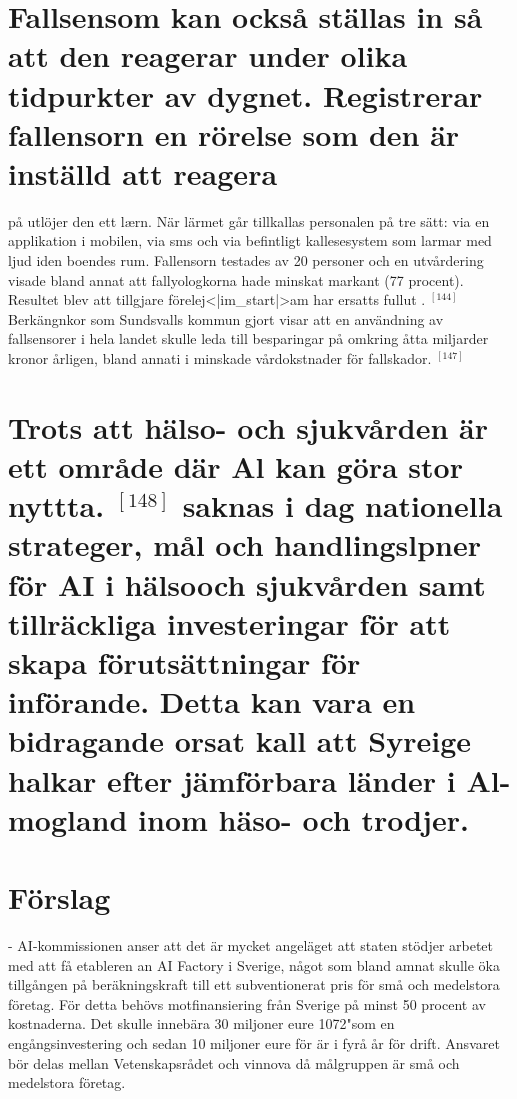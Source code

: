 {{{{{{{{{{{{{{{{{\section*{Fallsensom kan också ställas in så att den reagerar under olika tidpurkter av dygnet. Registrerar fallensorn en rörelse som den är inställd att reagera}
på utlöjer den ett lærn. När lärmet går tillkallas personalen på tre sätt: via en applikation i mobilen, via sms och via befintligt kallesesystem som larmar med ljud iden boendes rum. Fallensorn testades av 20 personer och en utvårdering visade bland annat att fallyologkorna hade minskat markant (77 procent). Resultet blev att tillgjare förelej<|im_start|>am har ersatts fullut . \({ }^{[144]}\)
Berkängnkor som Sundsvalls kommun gjort visar att en användning av fallsensorer i hela landet skulle leda till besparingar på omkring åtta miljarder kronor årligen, bland annati i minskade vårdokstnader för fallskador. \({ }^{[147]}\)
\section*{Trots att hälso- och sjukvården är ett område där Al kan göra stor nyttta. \({ }^{[148]}\) saknas i dag nationella strateger, mål och handlingslpner för AI i hälsooch sjukvården samt tillräckliga investeringar för att skapa förutsättningar för införande. Detta kan vara en bidragande orsat kall att Syreige halkar efter jämförbara länder i Al-mogland inom häso- och trodjer.}

\section*{Förslag}
- AI-kommissionen anser att det är mycket angeläget att staten stödjer arbetet med att få etableren an AI Factory i Sverige, något som bland amnat skulle öka tillgången på beräkningskraft till ett subventionerat pris för små och medelstora företag. För detta behövs motfinansiering från Sverige på minst 50 procent av kostnaderna. Det skulle innebära 30 miljoner eure 1072"som en engångsinvestering och sedan 10 miljoner eure för är i fyrå år för drift. Ansvaret bör delas mellan Vetenskapsrådet och vinnova då målgruppen är små och medelstora företag.
}}}}}}}}}}}}}}}}}
